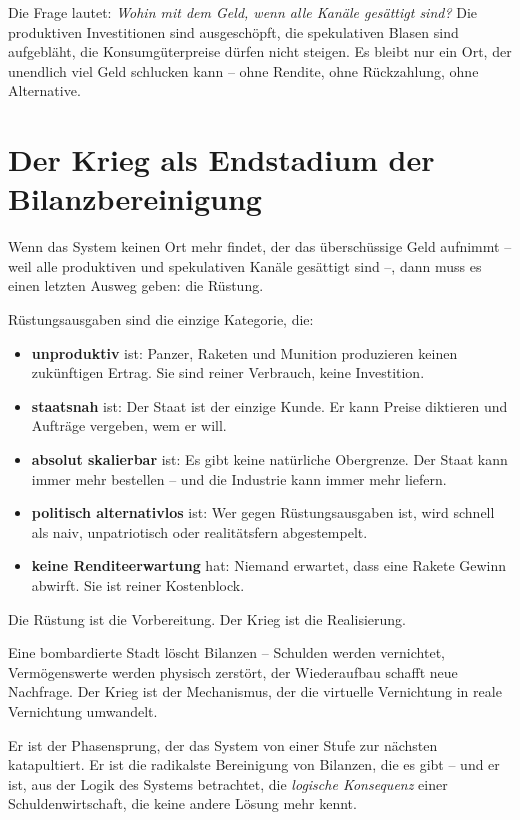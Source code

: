 \documentclass[12pt,a4paper]{book}
\begin{document}
Die Frage lautet: \emph{Wohin mit dem Geld, wenn alle Kanäle gesättigt sind?} Die produktiven Investitionen sind ausgeschöpft, die spekulativen Blasen sind aufgebläht, die Konsumgüterpreise dürfen nicht steigen. Es bleibt nur ein Ort, der unendlich viel Geld schlucken kann – ohne Rendite, ohne Rückzahlung, ohne Alternative.

\chapter{Der Krieg als Endstadium der Bilanzbereinigung}

Wenn das System keinen Ort mehr findet, der das überschüssige Geld aufnimmt – weil alle produktiven und spekulativen Kanäle gesättigt sind –, dann muss es einen letzten Ausweg geben: die Rüstung.

Rüstungsausgaben sind die einzige Kategorie, die:

\begin{itemize}
    \item \textbf{unproduktiv} ist: Panzer, Raketen und Munition produzieren keinen zukünftigen Ertrag. Sie sind reiner Verbrauch, keine Investition.
    \item \textbf{staatsnah} ist: Der Staat ist der einzige Kunde. Er kann Preise diktieren und Aufträge vergeben, wem er will.
    \item \textbf{absolut skalierbar} ist: Es gibt keine natürliche Obergrenze. Der Staat kann immer mehr bestellen – und die Industrie kann immer mehr liefern.
    \item \textbf{politisch alternativlos} ist: Wer gegen Rüstungsausgaben ist, wird schnell als naiv, unpatriotisch oder realitätsfern abgestempelt.
    \item \textbf{keine Renditeerwartung} hat: Niemand erwartet, dass eine Rakete Gewinn abwirft. Sie ist reiner Kostenblock.
\end{itemize}

Die Rüstung ist die Vorbereitung. Der Krieg ist die Realisierung.

Eine bombardierte Stadt löscht Bilanzen – Schulden werden vernichtet, Vermögenswerte werden physisch zerstört, der Wiederaufbau schafft neue Nachfrage. Der Krieg ist der Mechanismus, der die virtuelle Vernichtung in reale Vernichtung umwandelt.

Er ist der Phasensprung, der das System von einer Stufe zur nächsten katapultiert. Er ist die radikalste Bereinigung von Bilanzen, die es gibt – und er ist, aus der Logik des Systems betrachtet, die \emph{logische Konsequenz} einer Schuldenwirtschaft, die keine andere Lösung mehr kennt.
\end{document}
